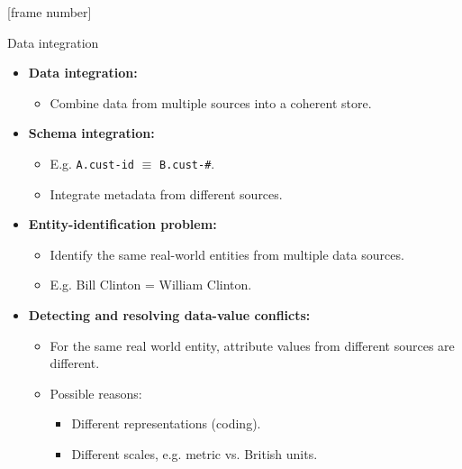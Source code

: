 \documentclass[aspectratio=169,t]{beamer}
\begin{document}
  {
    [frame number]
    \begin{frame}{Data integration}
    \begin{itemize}
       \item \textbf{Data integration:}
       \begin{itemize}
        \item Combine data from multiple sources into a coherent store.
       \end{itemize}
       \item \textbf{Schema integration:}
       \begin{itemize}
        \item E.g. \texttt{A.cust-id} $\equiv$ \texttt{B.cust-\#}.
        \item Integrate metadata from different sources.
       \end{itemize}
       \item \textbf{Entity-identification problem:}
       \begin{itemize}
        \item Identify the same real-world entities from multiple data sources.
        \item E.g. Bill Clinton = William Clinton.
       \end{itemize}
       \item \textbf{Detecting and resolving {\color{airforceblue}data-value conflicts}:}
       \begin{itemize}
        \item For the same real world entity, attribute values from different sources are different.
        \item Possible reasons:
        \begin{itemize}
          \item Different representations (coding).
          \item Different scales, e.g. metric vs. British units.
        \end{itemize}
       \end{itemize}
    \end{itemize}
    \end{frame}
  }
\end{document}
